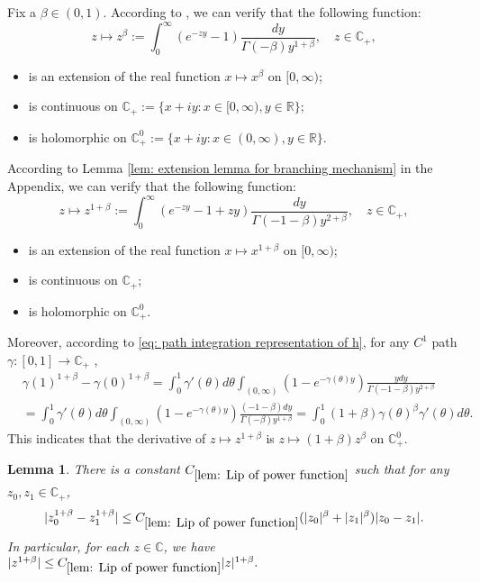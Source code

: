 \documentclass[12pt,oneside,english]{amsart}
\theoremstyle{plain}
\newtheorem{lem}[thm]{Lemma}
\theoremstyle{definition}
\numberwithin{equation}{section}
\begin{document}
{    Fix a $\beta \in (0,1)$.
    According to \cite[Theorem 3.2. \& Theorem 3.5.]{SchillingSongVondracek2010Bernstein}, we can verify that the following function:
\begin{equation}
    z
    \mapsto z^{\beta}
    := \int_0^\infty (e^{-zy}-1) \frac{dy}{\Gamma(-\beta)y^{1+\beta}},
    \quad z\in \mathbb C_+,
\end{equation}
\begin{itemize}
\item
    is an extension of the real function $x\mapsto x^{\beta}$ on $[0,\infty)$;
\item
    is continuous on $\mathbb C_+ :=\{x+iy: x\in [0,\infty), y\in \mathbb R\}$;
\item
    is holomorphic on $\mathbb C_+^0:= \{x+iy:x\in (0,\infty), y\in \mathbb R\}$.
\end{itemize}
    According to Lemma \ref{lem: extension lemma for branching mechanism} in the Appendix, we can verify that the following function:
\begin{equation}
\label{eq: stable branching on C+}
    z\mapsto
    z^{1+\beta}
    := \int_0^\infty (e^{-zy}-1+zy)\frac{dy}{\Gamma(-1-\beta)y^{2+\beta}},
    \quad z\in \mathbb C_+,
\end{equation}
\begin{itemize}
\item
    is an extension of the real function $x\mapsto x^{1+\beta}$ on $[0,\infty)$;
\item
    is continuous on $\mathbb C_+$;
\item
    is holomorphic on $\mathbb C_+^0$.
\end{itemize}
    Moreover, according to \eqref{eq: path integration representation of h}, for any $C^1$ path $\gamma:[0,1]\to \mathbb C_+$ ,
\begin{align}
\label{eq: integration formula for 1+beta-th power of z}
    &\gamma(1)^{1+\beta} - \gamma(0)^{1+\beta}
    = \int_0^1 \gamma'(\theta)d\theta \int_{(0,\infty)}(1-e^{-\gamma(\theta)y})\frac{ydy}{\Gamma(-1-\beta)y^{2+\beta}}
    \\&=\int_0^1 \gamma'(\theta)d\theta \int_{(0,\infty)}(1-e^{-\gamma(\theta)y})\frac{(-1-\beta)dy}{\Gamma(-\beta)y^{1+\beta}}
    = \int_0^1 (1+\beta) \gamma(\theta)^{\beta} \gamma'(\theta)d\theta.
\end{align}
    This indicates that the derivative of $z\mapsto z^{1+\beta}$ is $z\mapsto (1+\beta)z^{\beta}$ on $\mathbb C^0_+$.
\begin{lem}
\label{lem: Lip of power function}
    There is a constant $C_{\ref{lem: Lip of power function}}$ such that for any $z_0,z_1 \in \mathbb C_+$,
\begin{equation}
\label{eq: Lip of power function}
    |z_0^{1+\beta} - z_1^{1+\beta}|
    \leq C_{\ref{lem: Lip of power function}}(|z_0|^{\beta}+|z_1|^{\beta})|z_0 - z_1|.
\end{equation}
    In particular, for each $z\in \mathbb C$, we have
$
    |z^{1+\beta}|
    \leq  C_{\ref{lem: Lip of power function}} |z|^{1+\beta}.
$


\end{lem}}
\end{document}
